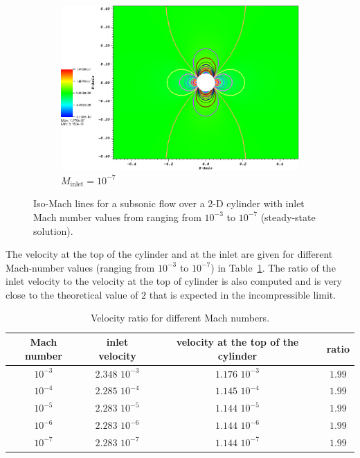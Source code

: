 \documentclass[preprint,10pt]{elsarticle}
\newcommand{\tbl}[1]{Table~\ref{#1}}                     %
\begin{document}
\begin{figure}[H]
        \begin{subfigure}[b]{0.495\textwidth}
                \centering
                \includegraphics[width=\textwidth]{CylinderMach1em7ZoomIn.png}
                \caption{$M_{\text{inlet}}=10^{-7}$}
                \label{fig:cyl_1em7}
        \end{subfigure}
        \caption{Iso-Mach lines for a subsonic flow over a 2-D cylinder with inlet Mach number values 
				from ranging from $10^{-3}$ to $10^{-7}$ (steady-state solution).}
				\label{fig:cylinder}
\end{figure}
%
The velocity at the top of the cylinder and at the inlet are given for different Mach-number values 
(ranging from $10^{-3}$ to $10^{-7}$) in \tbl{tbl:velocity_ratio}. The ratio of the inlet velocity to 
the velocity at the top of cylinder is also computed and is very close to the theoretical value of $2$ 
that is expected in the incompressible limit.
%
\begin{table}[H]
\begin{center}
 \caption{\label{tbl:velocity_ratio}Velocity ratio for different Mach numbers.}
\begin{tabular}{|c|c|c|c|}
\hline
Mach number & inlet velocity & velocity at the top of the cylinder & ratio \\ \hline
$10^{-3}$ & $2.348$ $10^{-3}$ & $1.176$ $10^{-3}$& $1.99$  \\ \hline
$10^{-4}$ & $2.285$ $10^{-4}$ & $1.145$ $10^{-4}$& $1.99$  \\ \hline
$10^{-5}$ & $2.283$ $10^{-5}$ & $1.144$ $10^{-5}$ & $1.99$ \\ \hline
$10^{-6}$ & $2.283$ $10^{-6}$ & $1.144$ $10^{-6}$ & $1.99$ \\ \hline
$10^{-7}$ & $2.283$ $10^{-7}$ & $1.144$ $10^{-7}$ & $1.99$ \\ \hline
\end{tabular}
\end{center}
\nonumber
\end{table}
\end{document}
